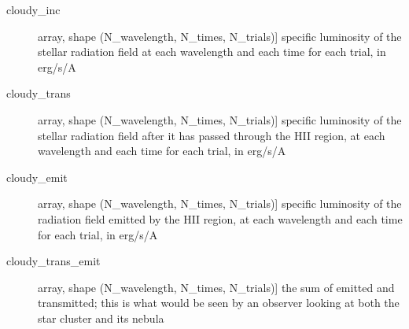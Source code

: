 \documentclass[letterpaper,10pt,english]{sphinxmanual}
\begin{document}
\begin{fulllineitems}
\begin{description}
\begin{description}
\item[{cloudy\_inc}] \leavevmode{[}array, shape (N\_wavelength, N\_times, N\_trials){]}
specific luminosity of the stellar radiation field at each
wavelength and each time for each trial, in erg/s/A

\item[{cloudy\_trans}] \leavevmode{[}array, shape (N\_wavelength, N\_times, N\_trials){]}
specific luminosity of the stellar radiation field after it has
passed through the HII region, at each wavelength and each time
for each trial, in erg/s/A

\item[{cloudy\_emit}] \leavevmode{[}array, shape (N\_wavelength, N\_times, N\_trials){]}
specific luminosity of the radiation field emitted by the HII
region, at each wavelength and each time for each trial, in
erg/s/A

\item[{cloudy\_trans\_emit}] \leavevmode{[}array, shape (N\_wavelength, N\_times, N\_trials){]}
the sum of emitted and transmitted; this is what would be seen
by an observer looking at both the star cluster and its nebula

\end{description}

\end{description}

\end{fulllineitems}

\end{document}
